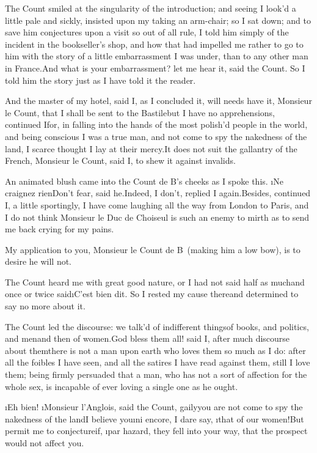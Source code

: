 \documentclass[twoside]{article}
\begin{document}
The Count smiled at the singularity of the
introduction; and seeing I look’d a little
pale and sickly, insisted upon my taking
an arm-chair; so I sat down; and to save
him conjectures upon a visit so out of all
rule, I told him simply of the incident in
the bookseller’s shop, and how that had
impelled me rather to go to him with the
story of a little embarrassment I was
under, than to any other man in
France.\tskk And what is your
embarrassment? let me hear it, said the
Count.  So I told him the story just as I
have told it the reader.

\tskk And the master of my hotel, said I,
as I concluded it, will needs have it,
Monsieur le Count, that I shall be sent to
the Bastile\tskk but I have no
apprehensions, continued I\tskk for, in
falling into the hands of the most
polish’d people in the world, and being
conscious I was a true man, and not come
to spy the nakedness of the land, I scarce
thought I lay at their mercy.\tskk It does
not suit the gallantry of the French,
Monsieur le Count, said I, to shew it
against invalids.

An animated blush came into the Count de
B\anon’s cheeks as I spoke this.\tskk
\i{Ne craignez rien}\tskk Don’t fear, said
he.\tskk Indeed, I don’t, replied I
again.\tskk Besides, continued I, a little
sportingly, I have come laughing all the
way from London to Paris, and I do not
think Monsieur le Duc de Choiseul is such
an enemy to mirth as to send me back
crying for my pains.

\tskk My application to you, Monsieur le
Count de B\anon\ (making him a low bow),
is to desire he will not.

The Count heard me with great good nature,
or I had not said half as much\tskk and
once or twice said\tskk \i{C’est bien
dit}.  So I rested my cause there\tskk and
determined to say no more about it.

The Count led the discourse: we talk’d of
indifferent things\tskk of books, and
politics, and men\tskk and then of
women.\tskk God bless them all! said I,
after much discourse about them\tskk there
is not a man upon earth who loves them so
much as I do: after all the foibles I have
seen, and all the satires I have read
against them, still I love them; being
firmly persuaded that a man, who has not a
sort of affection for the whole sex, is
incapable of ever loving a single one as
he ought.

\i{Eh bien}!  \i{Monsieur l’Anglois}, said
the Count, gaily\tskk you are not come to
spy the nakedness of the land\tskk I
believe you\tskk \i{ni encore}, I dare
say, \i{that} of our women!\tskk But
permit me to conjecture\tskk if, \i{par
hazard}, they fell into your way, that the
prospect would not affect you.
\end{document}
